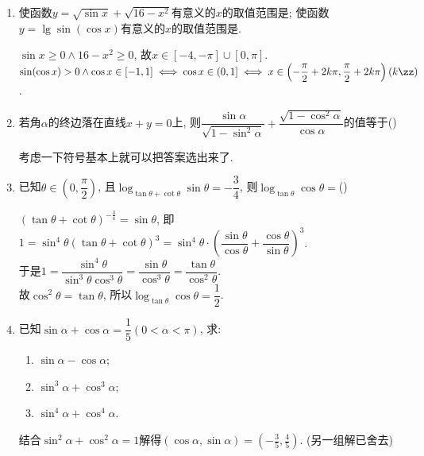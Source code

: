 \begin{enumerate}
\item 使函数$y=\sqrt{\sin{x}}+\sqrt{16-x^2}$有意义的$x$的取值范围是\blkda[3]{$[-4,-\pi]\cup[0,\pi]$}; 
使函数$y=\lg\sin(\cos{x})$有意义的$x$的取值范围是. 
\begin{jieda}
$\sin{x}\geq 0\land 16-x^2\geq 0$, 故$x\in[-4,-\pi]\cup[0,\pi]$. \\
$\sin(\cos{x})>0\land\cos{x}\in[-1,1]\iff\cos{x}\in(0,1]\iff x\in\left(-\dfrac{\pi}{2}+2k\pi,\dfrac{\pi}{2}+2k\pi\right)(k\zz)$. 
\end{jieda}

\item 若角$\alpha$的终边落在直线$x+y=0$上, 则$\dfrac{\sin\alpha}{\sqrt{1-\sin^2\alpha}}+\dfrac{\sqrt{1-\cos^2\alpha}}{\cos\alpha}$的值等于\dotfill()
\begin{jieda}
考虑一下符号基本上就可以把答案选出来了. 
\end{jieda}

\item 已知$\theta\in\left(0,\dfrac{\pi}{2}\right)$, 且$\log_{\tan\theta+\cot\theta}\sin\theta=-\dfrac{3}{4}$, 
则$\log_{\tan\theta}\cos\theta=$\dotfill()
\begin{jieda}
$(\tan\theta+\cot\theta)^{-\frac{3}{4}}=\sin\theta$, 
即$1=\sin^4\theta(\tan\theta+\cot\theta)^3=\sin^4\theta\cdot\left(\dfrac{\sin\theta}{\cos\theta}+\dfrac{\cos\theta}{\sin\theta}\right)^3$. \\
于是$1=\dfrac{\sin^4\theta}{\sin^3\theta\cos^3\theta}=\dfrac{\sin\theta}{\cos^3\theta}=\dfrac{\tan\theta}{\cos^2\theta}$. \\
故$\cos^2\theta=\tan\theta$, 所以$\log_{\tan\theta}\cos\theta=\dfrac{1}{2}$. 
\end{jieda}


\item 已知$\sin\alpha+\cos\alpha=\dfrac{1}{5}(0<\alpha<\pi)$, 求: 
\begin{enumerate}[(1)]
\item $\sin\alpha-\cos\alpha$; 
\item $\sin^3\alpha+\cos^3\alpha$; 
\item $\sin^4\alpha+\cos^4\alpha$. 
\end{enumerate}
\begin{jieda}
结合$\sin^2\alpha+\cos^2\alpha=1$解得$(\cos\alpha,\sin\alpha)=(-\frac{3}{5},\frac{4}{5})$. (另一组解已舍去)\\
\end{jieda}


\end{enumerate}
